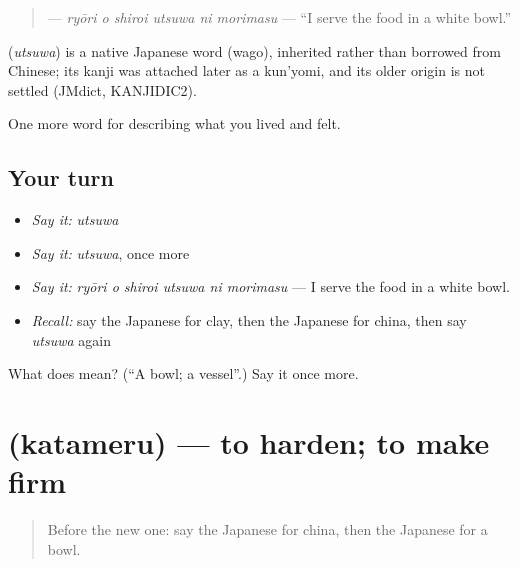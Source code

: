 \begin{quote}
\textbf{   } — \emph{ryōri o shiroi utsuwa ni morimasu} — \textquotedblleft{}I serve the food in a white bowl.\textquotedblright{}
\end{quote}

\begin{cousinweb}
\textbf{} (\emph{utsuwa}) is a native Japanese word (wago), inherited rather than borrowed from Chinese; its kanji was attached later as a kun'yomi, and its older origin is not settled (JMdict, KANJIDIC2).
\end{cousinweb}

\begin{grammarlens}[title={What you've built}]
One more word for describing what you lived and felt.
\end{grammarlens}

\subsection*{Your turn}
\begin{itemize}
\raggedright
  \item \emph{Say it:} \emph{utsuwa}
  \item \emph{Say it:} \emph{utsuwa}, once more
  \item \emph{Say it:} \emph{ryōri o shiroi utsuwa ni morimasu} — I serve the food in a white bowl.
  \item \emph{Recall:} say the Japanese for clay, then the Japanese for china, then say \emph{utsuwa} again
\end{itemize}

\begin{tcolorbox}[breakable,colback=teal!4,colframe=teal!35!black,title={Before you move on}]
What does  mean? (\textquotedblleft{}A bowl; a vessel\textquotedblright{}.) Say it once more.
\end{tcolorbox}
\section[\texorpdfstring{\ja{かためる} (katameru)}{かためる (katameru)}]{ (katameru) — to harden; to make firm}

\label{lesson:JA-C483-katameru}



\begin{quote}
Before the new one: say the Japanese for china, then the Japanese for a bowl.
\end{quote}

